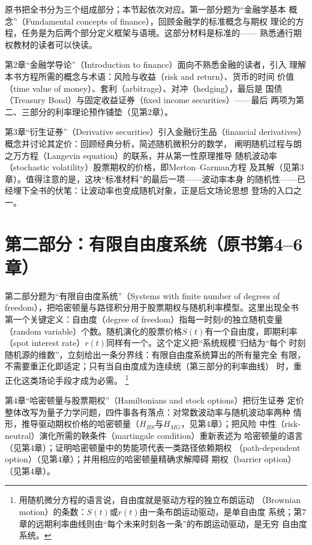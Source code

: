 原书把全书分为三个组成部分；本节起依次对应。第一部分题为“金融学基本
概念”（Fundamental concepts of finance），回顾金融学的标准概念与期权
理论的方程，任务是为后两个部分定义框架与语境。这部分材料是标准的——
熟悉通行期权教材的读者可以快读。

第2章“金融学导论”（Introduction to finance）面向不熟悉金融的读者，引入
理解本书方程所需的概念与术语：风险与收益（risk and return）、货币的时间
价值（time value of money）、套利（arbitrage）、对冲（hedging），最后是
国债（Treasury Bond）与固定收益证券（fixed income securities）——最后
两项为第二、三部分的利率理论预作铺垫（见第2章）。

第3章“衍生证券”（Derivative securities）引入金融衍生品（financial
derivatives）概念并讨论其定价：回顾经典分析，简述随机微积分的数学，
阐明随机过程与朗之万方程（Langevin equation）的联系，并从第一性原理推导
随机波动率（stochastic volatility）股票期权的价格，即Merton--Garman方程
及其解（见第3章）。值得注意的是，这块“标准材料”的最后一项——波动率本身
的随机性——已经埋下全书的伏笔：让波动率也变成随机对象，正是后文场论思想
登场的入口之一。

\section{第二部分：有限自由度系统（原书第4--6章）}

第二部分题为“有限自由度系统”（Systems with finite number of degrees of
freedom），把哈密顿量与路径积分用于股票期权与随机利率模型。这里出现全书
第一个关键定义：自由度（degree of freedom）指每一时刻$t$的独立随机变量
（random variable）个数。随机演化的股票价格$S(t)$有一个自由度，即期利率
（spot interest rate）$r(t)$同样有一个。这个定义把“系统规模”归结为“每个
时刻随机源的维数”，立刻给出一条分界线：有限自由度系统算出的所有量完全
有限，不需要重正化即适定；只有当自由度成为连续统（第三部分的利率曲线）
时，重正化这类场论手段才成为必需。
\footnote{用随机微分方程的语言说，自由度就是驱动方程的独立布朗运动
（Brownian motion）的条数：$S(t)$或$r(t)$由一条布朗运动驱动，是单自由度
系统；第7章的远期利率曲线则由“每个未来时刻各一条”的布朗运动驱动，是无穷
自由度系统。}

第4章“哈密顿量与股票期权”（Hamiltonians and stock options）把衍生证券
定价整体改写为量子力学问题，四件事各有落点：对常数波动率与随机波动率两种
情形，推导驱动期权价格的哈密顿量（$H_{BS}$与$H_{MG}$，见第4章）；把风险
中性（risk-neutral）演化所需的鞅条件（martingale condition）重新表述为
哈密顿量的语言（见第4章）；证明哈密顿量中的势能项代表一类路径依赖期权
（path-dependent option）（见第4章）；并用相应的哈密顿量精确求解障碍
期权（barrier option）（见第4章）。

